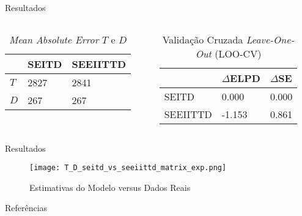 \begin{frame}{Resultados}
    \begin{columns}
        \begin{column}{0.5\textwidth}
	\begin{table}[]
		\centering
		\begin{tabular}{@{}lll@{}}
			\toprule
			 & SEITD & SEEIITTD \\ \midrule
			$T$ & 2827 & 2841 \\
			$D$ & 267 & 267 \\ \bottomrule
		\end{tabular}
		\caption{\textit{Mean Absolute Error} $T$ e $D$}
		\label{tbl:MAE}
	\end{table}
        \end{column}
        \begin{column}{0.5\textwidth}
	\begin{table}[]
		\centering
		\begin{tabular}{@{}lll@{}}
			\toprule
 			& $\Delta$ELPD & $\Delta$SE \\ \midrule
			SEITD & 0.000 & 0.000 \\
			SEEIITTD & -1.153 & 0.861 \\ \bottomrule
		\end{tabular}
		\caption{Validação Cruzada \textit{Leave-One-Out} (LOO-CV) \parencite{vehtariLooEfficientLeaveoneout2020}}
		\label{tbl:LOO}
	\end{table}
        \end{column}
    \end{columns}
\end{frame}

\begin{frame}{Resultados}
	\begin{figure}
		\centering
		\texttt{[image: T\_D\_seitd\_vs\_seeiittd\_matrix\_exp.png]}
		\caption{Estimativas do Modelo versus Dados Reais}
		\label{fig:ambidex_performance}
	\end{figure}
\end{frame}

\begin{frame}[allowframebreaks]{Referências}
	\printbibliography
\end{frame}

